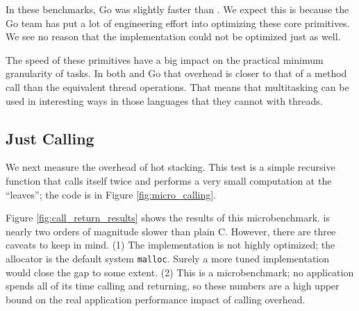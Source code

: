 \documentclass[acmsmall,anonymous,review]{acmart}\settopmatter{printfolios=true,printccs=false,printacmref=false}
\begin{document}
In these benchmarks, Go was slightly faster than \charcoal{}.
We expect this is because the Go team has put a lot of engineering effort into optimizing these core primitives.
We see no reason that the \charcoal{} implementation could not be optimized just as well.

The speed of these primitives have a big impact on the practical minimum granularity of tasks.
In both \charcoal{} and Go that overhead is closer to that of a method call than the equivalent thread operations.
That means that multitasking can be used in interesting ways in those languages that they cannot with threads.

\subsection{Just Calling}

We next measure the overhead of hot stacking.
This test is a simple recursive function that calls itself twice and performs a very small computation at the ``leaves''; the code is in Figure \ref{fig:micro_calling}.

Figure \ref{fig:call_return_results} shows the results of this microbenchmark.
\charcoal{} is nearly two orders of magnitude slower than plain C.
However, there are three caveats to keep in mind.
(1) The \charcoal{} implementation is not highly optimized; the allocator is the default system \texttt{malloc}.
Surely a more tuned implementation would close the gap to some extent.
(2) This is a microbenchmark; no application spends all of its time calling and returning, so these numbers are a high upper bound on the real application performance impact of calling overhead.
\end{document}
